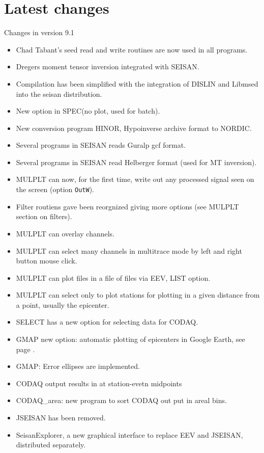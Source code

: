 \section{Latest changes}
Changes in version 9.1
\begin{itemize}
\item Chad Tabant's seed read and write  routines are now used in all programs. 
\item Dregers moment tensor inversion integrated with SEISAN.
\item Compilation has been simplified with the integration of DISLIN and Libmsed into the seisan distribution.
\item New option in SPEC(no plot, used for batch).
\item New conversion program HINOR, Hypoinverse archive format to NORDIC.
\item Several programs in SEISAN reads Guralp gcf format.
\item Several programs in SEISAN read Helberger format (used for MT inversion).
\item MULPLT can now, for the first time, write out any processed signal seen on the screen (option \texttt{OutW}).
\item Filter routiens gave been reorgnized giving more options (see MULPLT section on filters).
\item MULPLT can overlay channels.
\item MULPLT can select many channels in multitrace mode by left and right button mouse click.
\item MULPLT can plot files in a file of files via EEV, LIST option. 
\item MULPLT can select only to plot stations for plotting in  a given distance from a point, usually the epicenter.
\item SELECT has a new option for selecting data for CODAQ.
\item GMAP new option: automatic plotting of epicenters in Google Earth, see page \pageref{subs:gmap}.
\item GMAP: Error ellipses are implemented.
\item CODAQ output results in at station-evetn midpoints
\item CODAQ\_area: new program to sort CODAQ out put in areal bins.
\item JSEISAN has been removed.
\item SeisanExplorer, a new graphical interface to replace EEV and JSEISAN, distributed separately.
\end{itemize}


